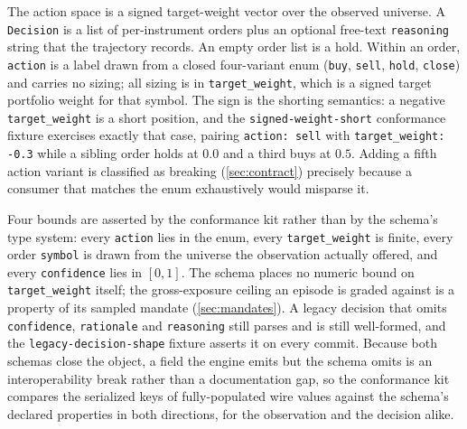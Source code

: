 The action space is a signed target-weight vector over the observed universe. A \texttt{Decision} is a list of per-instrument orders plus an optional free-text \texttt{reasoning} string that the trajectory records. An empty order list is a hold. Within an order, \texttt{action} is a label drawn from a closed four-variant enum (\texttt{buy}, \texttt{sell}, \texttt{hold}, \texttt{close}) and carries no sizing; all sizing is in \texttt{target\_weight}, which is a signed target portfolio weight for that symbol. The sign is the shorting semantics: a negative \texttt{target\_weight} is a short position, and the \texttt{signed-weight-short} conformance fixture exercises exactly that case, pairing \texttt{action: sell} with \texttt{target\_weight: -0.3} while a sibling order holds at $0.0$ and a third buys at $0.5$. Adding a fifth action variant is classified as breaking (\cref{sec:contract}) precisely because a consumer that matches the enum exhaustively would misparse it.

Four bounds are asserted by the conformance kit rather than by the schema's type system: every \texttt{action} lies in the enum, every \texttt{target\_weight} is finite, every order \texttt{symbol} is drawn from the universe the observation actually offered, and every \texttt{confidence} lies in $[0,1]$. The schema places no numeric bound on \texttt{target\_weight} itself; the gross-exposure ceiling an episode is graded against is a property of its sampled mandate (\cref{sec:mandates}). A legacy decision that omits \texttt{confidence}, \texttt{rationale} and \texttt{reasoning} still parses and is still well-formed, and the \texttt{legacy-decision-shape} fixture asserts it on every commit. Because both schemas close the object, a field the engine emits but the schema omits is an interoperability break rather than a documentation gap, so the conformance kit compares the serialized keys of fully-populated wire values against the schema's declared properties in both directions, for the observation and the decision alike.

